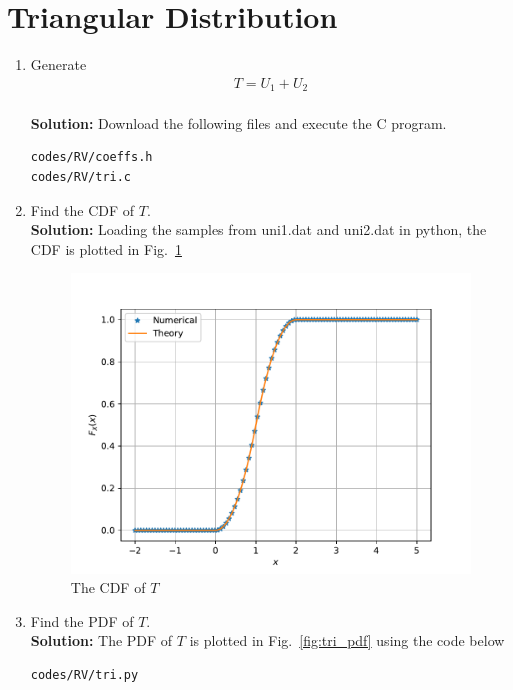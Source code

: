 \documentclass[journal,8pt,onecolumn]{IEEEtran}
\newcommand\figref{Fig.~\ref}
\newcommand{\solution}{\noindent \textbf{Solution: }}
\begin{document}
\section{Triangular Distribution}
%
\begin{enumerate}
\item Generate 
	\begin{align}
		T = U_1+U_2
	\end{align}\\
\solution Download the following files and execute the  C program.
\begin{lstlisting}
codes/RV/coeffs.h
codes/RV/tri.c
\end{lstlisting}
\item Find the CDF of $T$.\\
\solution Loading the samples from uni1.dat and uni2.dat in python, the CDF is plotted in \figref{fig:tri_cdf} 
\begin{figure}[H]
\centering
\includegraphics[width=\columnwidth/2]{./figs/tri_cdf.pdf}
\caption{The CDF of $T$}
\label{fig:tri_cdf}
\end{figure}
\item Find the PDF of $T$.\\
\solution The PDF of $T$ is plotted in \figref{fig:tri_pdf} using the code below
\begin{lstlisting}
codes/RV/tri.py
\end{lstlisting}
\begin{figure}[H]
\centering

\end{figure}
\end{enumerate}
\end{document}
